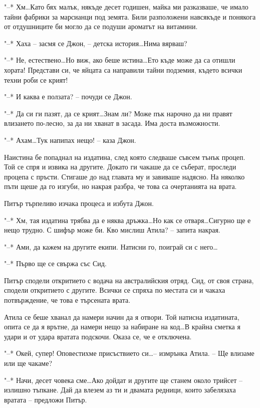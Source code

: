 \documentclass[ebook,openany,12pt]{memoir}
\begin{document}
"--* Хм\ldots Като бях малък, някъде десет годишен, майка ми разказваше, че имало тайни фабрики за марсианци под земята. Били разположени навсякъде и понякога от отдушниците би могло да се подуши ароматът на витамини.

"--* Хаха – засмя се Джон, – детска история\ldots Нима вярваш?

"--* Не, естествено\ldots Но виж, ако беше истина\ldots Ето къде може да са отишли хората! Представи си, че яйцата са направили тайни подземия, където всички техни роби се крият!

"--* И каква е ползата? – почуди се Джон.

"--* Да си ги пазят, да се крият\ldots Знам ли? Може пък нарочно да ни правят влизането по-лесно, за да ни хванат в засада. Има доста възможности.

"--* Ахам\ldots Тук напипах нещо! – каза Джон.

Наистина бе попаднал на издатина, след която следваше съвсем тънък процеп. Той се спря и извика на другите. Докато ги чакаше да се съберат, проследи процепа с пръсти. Стигаше до над главата му и завиваше надясно. На няколко пъти щеше да го изгуби, но накрая разбра, че това са очертанията на врата.

Питър търпеливо изчака процеса и избута Джон. 

"--* Хм, тая издатина трябва да е няква дръжка\ldots Но как се отваря\ldots Сигурно ще е нещо трудно. С шифър може би. Кво мислиш Атила? – запита накрая.

"--* Ами, да кажем на другите екипи. Натисни го, поиграй си с него\ldots

"--* Първо ще се свържа със Сид.

Питър сподели откритието с водача на австралийския отряд. Сид, от своя страна, сподели откритието с другите. Всички се спряха по местата си и чакаха потвърждение, че това е търсената врата.

Атила се беше хванал да намери начин да я отвори. Той натисна издатината, опита се да я врътне, да намери нещо за набиране на код\ldots В крайна сметка я удари и от удара вратата подскочи. Оказа се, че е отключена.

"--* Окей, супер! Оповестихме присъствието си\ldots -- измрънка Атила. – Ще влизаме или ще чакаме?

"--* Начи, десет човека сме\ldots Ако дойдат и другите ще станем около трийсет – излишно тъпкане. Дай да влезем аз ти и двамата редници, които забелязаха вратата – предложи Питър.
\end{document}
